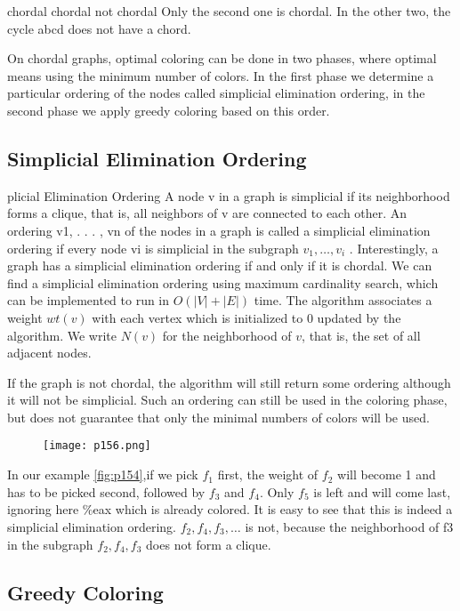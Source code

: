 chordal chordal not chordal
Only the second one is chordal. In the other two, the cycle abcd does not
have a chord.

On chordal graphs, optimal coloring can be done in two phases, where
optimal means using the minimum number of colors. In the first phase
we determine a particular ordering of the nodes called simplicial elimination
ordering, in the second phase we apply greedy coloring based on this order.


\subsection{Simplicial Elimination Ordering}

plicial Elimination Ordering
A node v in a graph is simplicial if its neighborhood forms a clique, that
is, all neighbors of v are connected to each other. An ordering v1, . . . , vn
of the nodes in a graph is called a simplicial elimination ordering if every
node vi
is simplicial in the subgraph $v_1, \dots , v_i$
. Interestingly, a graph has
a simplicial elimination ordering if and only if it is chordal. We can find
a simplicial elimination ordering using maximum cardinality search, which
can be implemented to run in $O(|V | + |E|)$ time. The algorithm associates
a weight $wt(v)$ with each vertex which is initialized to 0 updated by the
algorithm. We write $N(v)$ for the neighborhood of $v$, that is, the set of all
adjacent nodes.

If the graph is not chordal, the algorithm will still return some ordering
although it will not be simplicial. Such an ordering can still be used in the
coloring phase, but does not guarantee that only the minimal numbers of colors will be used.

\begin{figure}[H]
	\centering
	\texttt{[image: p156.png]}
	\caption{}
	\label{fig:p156}
\end{figure}

In our example \ref{fig:p154},if we pick $f_1$ first, the weight of $f_2$ will become 1 and has
to be picked second, followed by $f_3$ and $f_4$.
Only $f_5$ is left and will come last, ignoring here
\%eax which is already colored. It is easy to see that this is indeed a simplicial
elimination ordering. $f_2, f_4, f_3,\dots$ is not, because the neighborhood of
f3 in the subgraph $f_2, f_4, f_3$ does not form a clique.


\subsection{Greedy Coloring}

